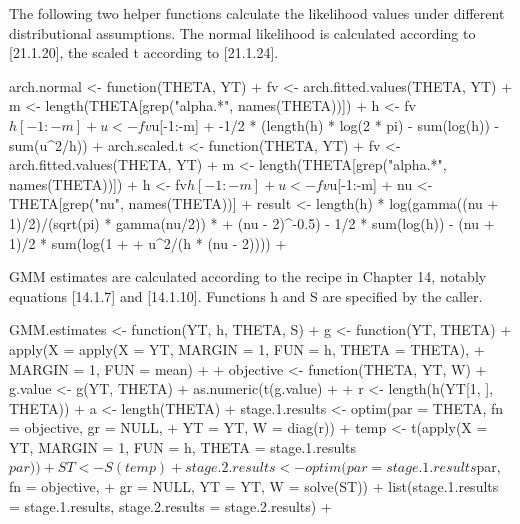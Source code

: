\documentclass[a4paper]{article}
\renewcommand{\~}{\perispomeni}%
\begin{document}
The following two helper functions calculate the likelihood values under different distributional assumptions.
The normal likelihood is calculated according to [21.1.20], the scaled t according to [21.1.24].
\begin{Schunk}
\begin{Sinput}
 arch.normal <- function(THETA, YT) {
+     fv <- arch.fitted.values(THETA, YT)
+     m <- length(THETA[grep("alpha.*", names(THETA))])
+     h <- fv$h[-1:-m]
+     u <- fv$u[-1:-m]
+     -1/2 * (length(h) * log(2 * pi) - sum(log(h)) - sum(u^2/h))
+ }
 arch.scaled.t <- function(THETA, YT) {
+     fv <- arch.fitted.values(THETA, YT)
+     m <- length(THETA[grep("alpha.*", names(THETA))])
+     h <- fv$h[-1:-m]
+     u <- fv$u[-1:-m]
+     nu <- THETA[grep("nu", names(THETA))]
+     result <- length(h) * log(gamma((nu + 1)/2)/(sqrt(pi) * gamma(nu/2)) * 
+         (nu - 2)^-0.5) - 1/2 * sum(log(h)) - (nu + 1)/2 * sum(log(1 + 
+         u^2/(h * (nu - 2))))
+ }
\end{Sinput}
\end{Schunk}
GMM estimates are calculated according to the recipe in Chapter 14, notably
equations [14.1.7] and [14.1.10].  Functions h and S are specified
by the caller.
\begin{Schunk}
\begin{Sinput}
 GMM.estimates <- function(YT, h, THETA, S) {
+     g <- function(YT, THETA) {
+         apply(X = apply(X = YT, MARGIN = 1, FUN = h, THETA = THETA), 
+             MARGIN = 1, FUN = mean)
+     }
+     objective <- function(THETA, YT, W) {
+         g.value <- g(YT, THETA)
+         as.numeric(t(g.value) %
+     }
+     r <- length(h(YT[1, ], THETA))
+     a <- length(THETA)
+     stage.1.results <- optim(par = THETA, fn = objective, gr = NULL, 
+         YT = YT, W = diag(r))
+     temp <- t(apply(X = YT, MARGIN = 1, FUN = h, THETA = stage.1.results$par))
+     ST <- S(temp)
+     stage.2.results <- optim(par = stage.1.results$par, fn = objective, 
+         gr = NULL, YT = YT, W = solve(ST))
+     list(stage.1.results = stage.1.results, stage.2.results = stage.2.results)
+ }
\end{Sinput}
\end{Schunk}
\end{document}
